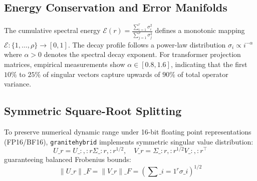 \subsection{Energy Conservation and Error Manifolds}
The cumulative spectral energy $\mathcal{E}(r) = \frac{\sum_{i=1}^r \sigma_i^2}{\sum_{j=1}^\rho \sigma_j^2}$ defines a monotonic mapping $\mathcal{E}: \{1, \dots, \rho\} \to [0, 1]$. The decay profile follows a power-law distribution $\sigma_i \propto i^{-\alpha}$ where $\alpha > 0$ denotes the spectral decay exponent. For transformer projection matrices, empirical measurements show $\alpha \in [0.8, 1.6]$, indicating that the first $10\%$ to $25\%$ of singular vectors capture upwards of $90\%$ of total operator variance.

\subsection{Symmetric Square-Root Splitting}
To preserve numerical dynamic range under 16-bit floating point representations (FP16/BF16), \texttt{granitehybrid} implements symmetric singular value distribution:
\[
U\_r = U\_{:, :r} \Sigma\_{:r, :r}^{1/2}, \quad V\_r = \Sigma\_{:r, :r}^{1/2} V\_{:, :r}^\top
\]
guaranteeing balanced Frobenius bounds:
\[
\|U\_r\|\_F = \|V\_r\|\_F = \left( \sum\_{i=1}^{r} \sigma\_i \right)^{1/2}
\]
